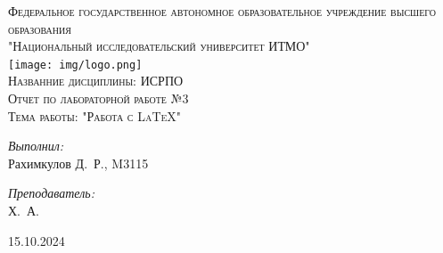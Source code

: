\begin{titlepage}
\begin{center}

\textsc{\Large Федеральное государственное автономное образовательное учреждение высшего образования}\\
\textsc{\large "Национальный исследовательский университет ИТМО"}\\[0.5cm]

\texttt{[image: img/logo.png]}~\\[0.5cm]

\textsc{\Large Названние дисциплины: ИСРПО 
\\ Отчет по лабораторной работе №3
\\ Тема работы: "Работа с LaTeX"}
\\[5cm]


\noindent
\begin{minipage}{0.4\textwidth}
\begin{flushleft} \large
\emph{Выполнил:}\\
Рахимкулов \textsc{Д.~Р.}, M3115
\end{flushleft}
\end{minipage}
\begin{minipage}{0.4\textwidth}
\begin{flushright} \large
\emph{Преподаватель:}\\
\quad\quad{} \textsc{Х.~А.}
\end{flushright}
\end{minipage}

\vfill

{\large 15.10.2024}

\end{center}
\end{titlepage}
